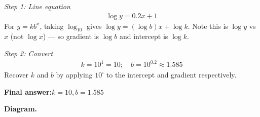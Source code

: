 \documentclass[11pt]{article}
\begin{document}
\textit{Step 1: Line equation}
\[\begin{gathered}
\log y = 0.2x + 1
\end{gathered}\]
For \( y = kb^x \), taking \( \log_{10} \) gives \( \log y = (\log b)x + \log k \). Note this is \( \log y \) vs \( x \) (not \( \log x \)) --- so gradient is \( \log b \) and intercept is \( \log k \).

\textit{Step 2: Convert}
\[\begin{gathered}
k = 10^1 = 10; \quad b = 10^{0.2} \approx 1.585
\end{gathered}\]
Recover \( k \) and \( b \) by applying \( 10^{\square} \) to the intercept and gradient respectively.

\begin{answerbox}
\textbf{Final answer:}\quad \(\displaystyle k = 10, b = 1.585\)
\end{answerbox}
\textbf{Diagram.}
\end{document}
